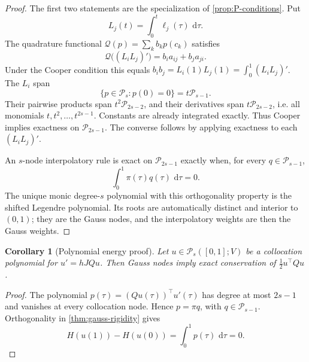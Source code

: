 \documentclass[11pt,a4paper]{article}
\newtheorem{corollary}[theorem]{Corollary}
\newcommand{\cP}{\mathcal P}
\newcommand{\dd}{\,\mathrm d}
\begin{document}
\begin{proof}
The first two statements are the specialization of
\cref{prop:P-conditions}. Put
\[
 L_j(t)=\int_0^t\ell_j(\tau)\,\dd\tau.
\]
The quadrature functional \(\mathcal Q(p)=\sum_kb_kp(c_k)\) satisfies
\[
 \mathcal Q\bigl((L_iL_j)'\bigr)
 =b_i a_{ij}+b_j a_{ji}.
\]
Under the Cooper condition this equals
\(b_ib_j=L_i(1)L_j(1)=\int_0^1(L_iL_j)'\).
The \(L_i\) span
\[
 \{p\in\cP_s:p(0)=0\}=t\cP_{s-1}.
\]
Their pairwise products span \(t^2\cP_{2s-2}\), and their derivatives
span \(t\cP_{2s-2}\), i.e. all monomials
\(t,t^2,\ldots,t^{2s-1}\). Constants are already integrated exactly.
Thus Cooper implies exactness on \(\cP_{2s-1}\). The converse follows by
applying exactness to each \((L_iL_j)'\).

An \(s\)-node interpolatory rule is exact on \(\cP_{2s-1}\) exactly when,
for every \(q\in\cP_{s-1}\),
\[
 \int_0^1\pi(\tau)q(\tau)\,\dd\tau=0.
\]
The unique monic degree-\(s\) polynomial with this orthogonality property is
the shifted Legendre polynomial. Its roots are automatically distinct and
interior to \((0,1)\); they are the Gauss nodes, and the
interpolatory weights are then the Gauss weights.
\end{proof}

\begin{corollary}[Polynomial energy proof]\label{cor:polynomial-energy}
Let \(u\in\cP_s([0,1];V)\) be a collocation polynomial for
\(u'=hJQu\). Then Gauss nodes imply exact conservation of
\(\tfrac12u^\top Qu\).
\end{corollary}

\begin{proof}
The polynomial \(p(\tau)=(Qu(\tau))^\top u'(\tau)\) has degree at most
\(2s-1\) and vanishes at every collocation node. Hence
\(p=\pi q\), with \(q\in\cP_{s-1}\). Orthogonality in
\cref{thm:gauss-rigidity} gives
\[
 H(u(1))-H(u(0))=\int_0^1p(\tau)\,\dd\tau=0.
\]
\end{proof}
\end{document}
